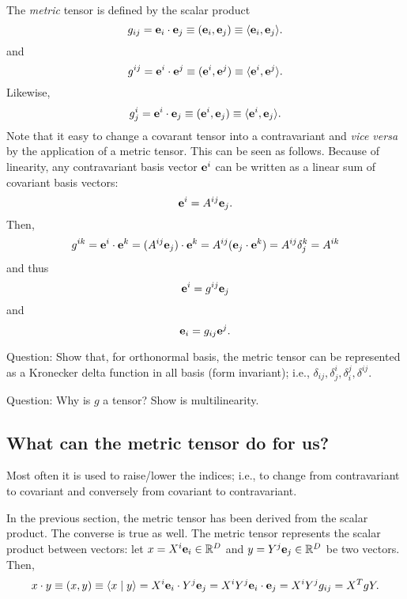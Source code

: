 The {\em metric} tensor is defined by  the scalar product
\begin{equation}
g_{ij}={\bf e}_i\cdot {\bf e}_j\equiv ({\bf e}_i, {\bf e}_j)\equiv \langle {\bf e}_i, {\bf e}_j\rangle .
\end{equation}
and
\begin{equation}
g^{ij}={\bf e}^i\cdot {\bf e}^j\equiv ({\bf e}^i, {\bf e}^j)\equiv \langle {\bf e}^i, {\bf e}^j\rangle .
\end{equation}
Likewise,
\begin{equation}
g^i_{j}={\bf e}^i\cdot {\bf e}_j\equiv ({\bf e}^i, {\bf e}_j)\equiv \langle {\bf e}^i, {\bf e}_j\rangle .
\end{equation}
Note that it easy to change a covarant tensor into a contravariant and {\em vice versa}
by the application of a metric tensor.
This can be seen as follows.
Because of linearity, any contravariant basis vector ${\bf e}^i$
can be written as a linear sum of covariant basis vectors:
\begin{equation}
{\bf e}^i=A^{ij}{\bf e}_j.
\end{equation}
Then,
\begin{equation}
g^{ik} ={\bf e}^i\cdot {\bf e}^k =(A^{ij}{\bf e}_j)\cdot {\bf e}^k=A^{ij}({\bf e}_j\cdot {\bf e}^k)=A^{ij}\delta_j^k=A^{ik}
\end{equation}
and thus
\begin{equation}
{\bf e}^i=g^{ij}{\bf e}_j
\end{equation}
and
\begin{equation}
{\bf e}_i=g_{ij}{\bf e}^j.
\end{equation}


Question: Show that, for orthonormal basis, the metric tensor can be
represented as a Kronecker delta function in all basis (form invariant);
i.e.,
$\delta_{ij},\delta^i_j,\delta_i^j,\delta^{ij}$.

Question: Why is $g$ a tensor? Show is multilinearity.

\subsection{What can the metric tensor do for us?}

Most often it is used to raise/lower the indices; i.e.,
to change from contravariant to covariant and conversely from covariant
to contravariant.

In the previous section, the metric tensor has been derived from the scalar product.
The converse is true as well.
The metric tensor represents the scalar product between vectors: let
$x=X^i{\bf e}_i \in {\Bbb R}^D$ and $y=Y^j{\bf e}_j \in {\Bbb R}^D$ be two vectors.
Then,
\begin{equation}
x\cdot y\equiv (x,y)\equiv \langle x\mid y\rangle
= X^i {\bf e}_i\cdot Y^j {\bf e}_j
= X^iY^j {\bf e}_i\cdot  {\bf e}_j
=X^iY^j g_{ij}= X^T g Y.
\end{equation}

